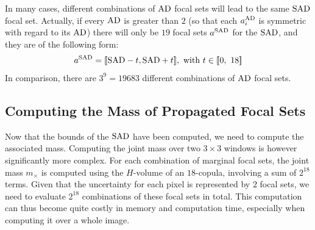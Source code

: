 \begin{remark}
    In many cases, different combinations of ${\mathrm{AD}}$ focal sets will lead to the same ${\mathrm{SAD}}$ focal set. Actually, if every ${\mathrm{AD}}$ is greater than $2$ (so that each $a^{\mathrm{AD}}_i$ is symmetric with regard to its ${\mathrm{AD}}$) there will only be $19$ focal sets $a^{\mathrm{SAD}}$ for the ${\mathrm{SAD}}$, and they are of the following form:
    \begin{align*}
        a^{\mathrm{SAD}} = {[\![}{\mathrm{SAD}}-t,{\mathrm{SAD}}+t{]\!]},\text{ with }t\in{[\![}0, ~18{]\!]}
    \end{align*}
    In comparison, there are $3^9=19683$ different combinations of ${\mathrm{AD}}$ focal sets.
\end{remark}

\subsection{Computing the Mass of Propagated Focal Sets}\label{sec:propagated_masses}
Now that the bounds of the ${\mathrm{SAD}}$ have been computed, we need to compute the associated mass. Computing the joint mass over two $3 \times 3$ windows is however significantly more complex. For each combination of marginal focal sets, the joint mass $m_{\times}$ is computed using the $H$-volume of an $18$-copula, involving a sum of $2^{18}$ terms. Given that the uncertainty for each pixel is represented by $2$ focal sets, we need to evaluate $2^{18}$ combinations of these focal sets in total. This computation can thus become quite costly in memory and computation time, especially when computing it over a whole image.

